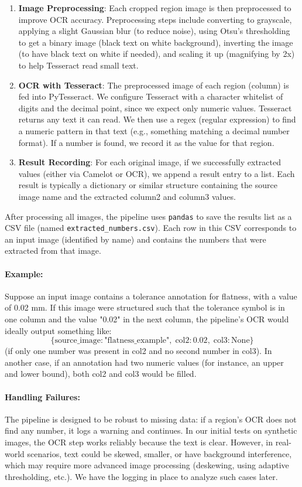 \documentclass[11pt,a4paper]{article}
\begin{document}
\begin{enumerate}
    \item \textbf{Image Preprocessing}: Each cropped region image is then preprocessed to improve OCR accuracy. Preprocessing steps include converting to grayscale, applying a slight Gaussian blur (to reduce noise), using Otsu’s thresholding to get a binary image (black text on white background), inverting the image (to have black text on white if needed), and scaling it up (magnifying by 2x) to help Tesseract read small text.
    \item \textbf{OCR with Tesseract}: The preprocessed image of each region (column) is fed into PyTesseract. We configure Tesseract with a character whitelist of digits and the decimal point, since we expect only numeric values. Tesseract returns any text it can read. We then use a regex (regular expression) to find a numeric pattern in that text (e.g., something matching a decimal number format). If a number is found, we record it as the value for that region.
    \item \textbf{Result Recording}: For each original image, if we successfully extracted values (either via Camelot or OCR), we append a result entry to a list. Each result is typically a dictionary or similar structure containing the source image name and the extracted column2 and column3 values.
\end{enumerate}

After processing all images, the pipeline uses \verb|pandas| to save the results list as a CSV file (named \verb|extracted_numbers.csv|). Each row in this CSV corresponds to an input image (identified by name) and contains the numbers that were extracted from that image.

\paragraph{Example:} Suppose an input image contains a tolerance annotation for flatness, with a value of 0.02 mm. If this image were structured such that the tolerance symbol is in one column and the value "0.02" in the next column, the pipeline’s OCR would ideally output something like:
\[
\{\text{source\_image}: \text{"flatness\_example"},\; \text{col2}: 0.02,\; \text{col3}: \text{None}\} 
\]
(if only one number was present in col2 and no second number in col3). In another case, if an annotation had two numeric values (for instance, an upper and lower bound), both col2 and col3 would be filled.

\paragraph{Handling Failures:} The pipeline is designed to be robust to missing data: if a region’s OCR does not find any number, it logs a warning and continues. In our initial tests on synthetic images, the OCR step works reliably because the text is clear. However, in real-world scenarios, text could be skewed, smaller, or have background interference, which may require more advanced image processing (deskewing, using adaptive thresholding, etc.). We have the logging in place to analyze such cases later.
\end{document}
